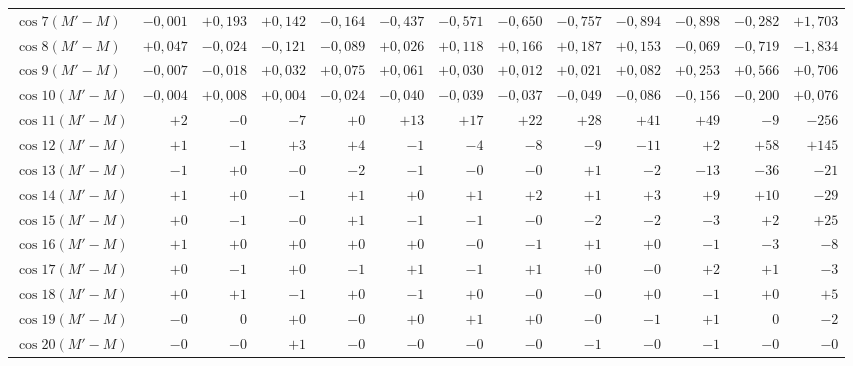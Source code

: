 \begin{landscape}
\begin{longtable}{@{}l|r|r|r|r|r|r|r|r|r|r|r|r@{}}
\(\cos 7(M'-M)\) & \(-0{,}001\) & \(+0{,}193\) & \(+0{,}142\) & \(-0{,}164\) & \(-0{,}437\) & \(-0{,}571\) & \(-0{,}650\) & \(-0{,}757\) & \(-0{,}894\) & \(-0{,}898\) & \(-0{,}282\) & \(+1{,}703\)\\
\(\cos 8(M'-M)\) & \(+0{,}047\) & \(-0{,}024\) & \(-0{,}121\) & \(-0{,}089\) & \(+0{,}026\) & \(+0{,}118\) & \(+0{,}166\) & \(+0{,}187\) & \(+0{,}153\) & \(-0{,}069\) & \(-0{,}719\) & \(-1{,}834\)\\
\(\cos 9(M'-M)\) & \(-0{,}007\) & \(-0{,}018\) & \(+0{,}032\) & \(+0{,}075\) & \(+0{,}061\) & \(+0{,}030\) & \(+0{,}012\) & \(+0{,}021\) & \(+0{,}082\) & \(+0{,}253\) & \(+0{,}566\) & \(+0{,}706\)\\
\(\cos 10(M'-M)\) & \(-0{,}004\) & \(+0{,}008\) & \(+0{,}004\) & \(-0{,}024\) & \(-0{,}040\) & \(-0{,}039\) & \(-0{,}037\) & \(-0{,}049\) & \(-0{,}086\) & \(-0{,}156\) & \(-0{,}200\) & \(+0{,}076\)\\
\(\cos 11(M'-M)\) & \(+2\) & \(-0\) & \(-7\) & \(+0\) & \(+13\) & \(+17\) & \(+22\) & \(+28\) & \(+41\) & \(+49\) & \(-9\) & \(-256\)\\
\(\cos 12(M'-M)\) & \(+1\) & \(-1\) & \(+3\) & \(+4\) & \(-1\) & \(-4\) & \(-8\) & \(-9\) & \(-11\) & \(+2\) & \(+58\) & \(+145\)\\
\(\cos 13(M'-M)\) & \(-1\) & \(+0\) & \(-0\) & \(-2\) & \(-1\) & \(-0\) & \(-0\) & \(+1\) & \(-2\) & \(-13\) & \(-36\) & \(-21\)\\
\(\cos 14(M'-M)\) & \(+1\) & \(+0\) & \(-1\) & \(+1\) & \(+0\) & \(+1\) & \(+2\) & \(+1\) & \(+3\) & \(+9\) & \(+10\) & \(-29\)\\
\(\cos 15(M'-M)\) & \(+0\) & \(-1\) & \(-0\) & \(+1\) & \(-1\) & \(-1\) & \(-0\) & \(-2\) & \(-2\) & \(-3\) & \(+2\) & \(+25\)\\
\(\cos 16(M'-M)\) & \(+1\) & \(+0\) & \(+0\) & \(+0\) & \(+0\) & \(-0\) & \(-1\) & \(+1\) & \(+0\) & \(-1\) & \(-3\) & \(-8\)\\
\(\cos 17(M'-M)\) & \(+0\) & \(-1\) & \(+0\) & \(-1\) & \(+1\) & \(-1\) & \(+1\) & \(+0\) & \(-0\) & \(+2\) & \(+1\) & \(-3\)\\
\(\cos 18(M'-M)\) & \(+0\) & \(+1\) & \(-1\) & \(+0\) & \(-1\) & \(+0\) & \(-0\) & \(-0\) & \(+0\) & \(-1\) & \(+0\) & \(+5\)\\
\(\cos 19(M'-M)\) & \(-0\) & \(0\) & \(+0\) & \(-0\) & \(+0\) & \(+1\) & \(+0\) & \(-0\) & \(-1\) & \(+1\) & \(0\) & \(-2\)\\
\(\cos 20(M'-M)\) & \(-0\) & \(-0\) & \(+1\) & \(-0\) & \(-0\) & \(-0\) & \(-0\) & \(-1\) & \(-0\) & \(-1\) & \(-0\) & \(-0\)\\

\end{longtable}
\end{landscape}
